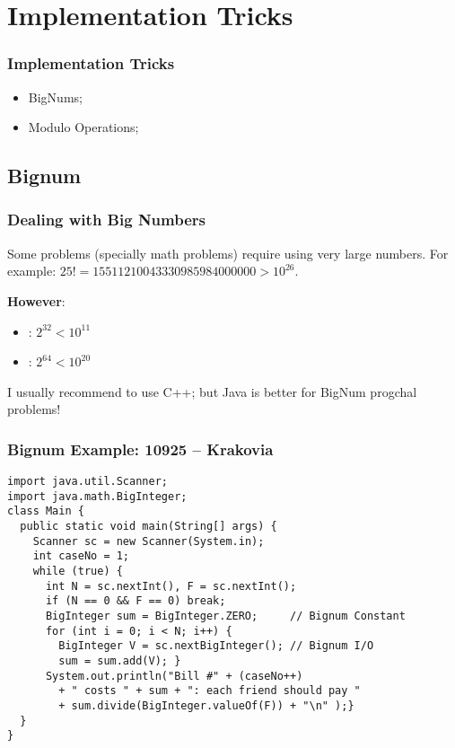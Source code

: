 \documentclass{beamer}
\begin{document}
\section{Implementation Tricks}

\begin{frame}
  \frametitle{Implementation Tricks}
  \begin{itemize}
    \item BigNums;
    \item Modulo Operations;
  \end{itemize}
\end{frame}

\subsection{Bignum}
\begin{frame}
  \frametitle{Dealing with Big Numbers}

  Some problems (specially math problems) require using very large numbers.
  For example: $25! = 15511210043330985984000000 > 10^{26}$.\bigskip

  {\bf However}:
  \begin{itemize}
    \item {}: $2^{32} < 10^{11}$
    \item {}: $2^{64} < 10^{20}$
  \end{itemize}\bigskip


  \begin{block}{}
    I usually recommend to use C++; but Java is better for
    BigNum progchal problems!
  \end{block}
\end{frame}

\begin{frame}[fragile]
  \frametitle{Bignum Example: 10925 -- Krakovia}

  {\smaller
\begin{block}{}
\begin{verbatim}
import java.util.Scanner;
import java.math.BigInteger;
class Main {
  public static void main(String[] args) {
    Scanner sc = new Scanner(System.in);
    int caseNo = 1;
    while (true) {
      int N = sc.nextInt(), F = sc.nextInt();
      if (N == 0 && F == 0) break;
      BigInteger sum = BigInteger.ZERO;     // Bignum Constant
      for (int i = 0; i < N; i++) {
        BigInteger V = sc.nextBigInteger(); // Bignum I/O
        sum = sum.add(V); }
      System.out.println("Bill #" + (caseNo++)
        + " costs " + sum + ": each friend should pay "
        + sum.divide(BigInteger.valueOf(F)) + "\n" );}
  }
}
\end{verbatim}
  \end{block}}
\end{frame}
\end{document}
